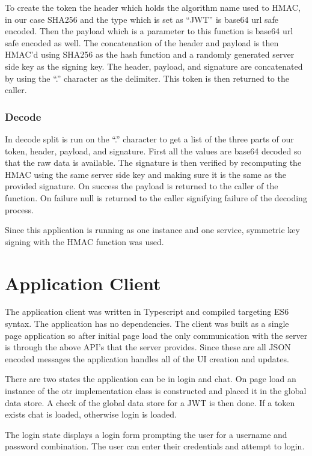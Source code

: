 To create the token the header which holds the algorithm name used to HMAC, in our case SHA256 and the type which is set as “JWT” is base64 url safe encoded. Then the payload which is a parameter to this function is base64 url safe encoded as well. The concatenation of the header and payload is then HMAC’d using SHA256 as the hash function and a randomly generated server side key as the signing key. The header, payload, and signature are concatenated by using the “.” character as the delimiter. This token is then returned to the caller.


\subsubsection{Decode}


In decode split is run on the “.” character to get a list of the three parts of our token, header, payload, and signature. First all the values are base64 decoded so that the raw data is available. The signature is then verified by recomputing the HMAC using the same server side key and making sure it is the same as the provided signature. On success the payload is returned to the caller of the function. On failure null is returned to the caller signifying failure of the decoding process.


Since this application is running as one instance and one service, symmetric key signing with the HMAC function was used. 


\section{Application Client}


The application client was written in Typescript and compiled targeting ES6 syntax. The application has no dependencies.  The client was built as a single page application so after initial page load the only communication with the server is through the above API’s that the server provides. Since these are all JSON encoded messages the application handles all of the UI creation and updates.


There are two states the application can be in login and chat. On page load an instance of the otr implementation class is constructed and placed it in the global data store. A check of the global data store for a JWT is then done. If a token exists chat is loaded, otherwise login is loaded.


The login state displays a login form prompting the user for a username and password combination. The user can enter their credentials and attempt to login. 


